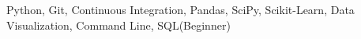 \begin{cvskills}
  \cvskill
    {Python, Git, Continuous Integration, Pandas, SciPy, Scikit-Learn, Data
    Visualization, Command Line, SQL(Beginner)}
    {} %

\end{cvskills}
